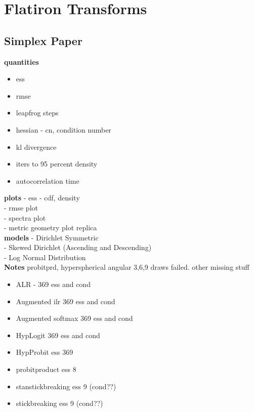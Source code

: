 \section{Flatiron Transforms}
\label{sec:transforms}
\subsection{Simplex Paper}

\textbf{quantities}
\begin{itemize}
\item ess \\
\item rmse \\
\item leapfrog steps \\
\item hessian - cn, condition number\\
\item kl divergence\\
\item iters to 95 percent density \\
\item autocorrelation time\\
\end{itemize}

\textbf{plots}
- ess - cdf, density\\
- rmse plot\\
- spectra plot\\
- metric geometry plot replica\\

\textbf{models}
- Dirichlet Symmetric\\
- Skewed Dirichlet (Ascending and Descending)\\
- Log Normal Distribution\\


\textbf{Notes}
probitprd, hyperspherical angular 3,6,9 draws failed. other missing stuff
\begin{itemize}
\item ALR - 369 ess and cond
\item Augmented ilr 369 ess and cond
\item Augmented softmax 369 ess and cond
\item HypLogit 369 ess and cond
\item HypProbit ess 369

\item probitproduct ess 8
\item stanstickbreaking ess 9 (cond??)
\item stickbreaking ess 9 (cond??)
\end{itemize}


